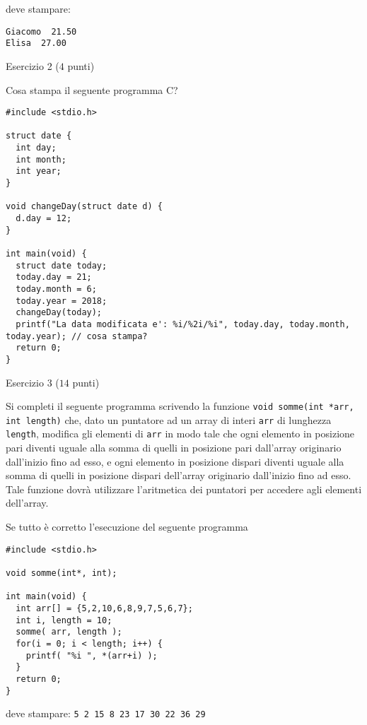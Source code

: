 \documentclass[12pt]{article}
\begin{document}
\noindent
deve stampare:

{\small
\begin{verbatim}
Giacomo  21.50
Elisa  27.00
\end{verbatim}
}


\vspace*{1ex}


\begin{center}
{\Large Esercizio 2} ($4$ punti)
\end{center}

\noindent Cosa stampa il seguente programma C?

\begin{lstlisting}
#include <stdio.h>
 
struct date {
  int day;
  int month;
  int year;
}

void changeDay(struct date d) {
  d.day = 12;  
}
 
int main(void) {
  struct date today;
  today.day = 21;
  today.month = 6;
  today.year = 2018;  
  changeDay(today);
  printf("La data modificata e': %i/%2i/%i", today.day, today.month, today.year); // cosa stampa?
  return 0;
}
\end{lstlisting}

\vspace*{1ex}


\begin{center}{\Large Esercizio 3} ($14$ punti)\end{center}


Si completi il seguente programma scrivendo la  funzione 
\texttt{void somme(int *arr, int length)} che, dato un puntatore ad un array di interi \texttt{arr} di lunghezza \texttt{length}, modifica gli elementi di \texttt{arr} in modo tale che ogni elemento in posizione pari diventi uguale alla somma di quelli in posizione pari dall'array originario dall'inizio fino ad esso, e ogni elemento in posizione dispari diventi uguale alla somma di quelli in posizione dispari dell'array originario dall'inizio fino ad esso. Tale funzione dovr\`a utilizzare l'aritmetica dei puntatori per accedere agli elementi dell'array.


Se tutto \`e corretto l'esecuzione del seguente programma

\begin{lstlisting}
#include <stdio.h>

void somme(int*, int);

int main(void) {
  int arr[] = {5,2,10,6,8,9,7,5,6,7};
  int i, length = 10;
  somme( arr, length );  
  for(i = 0; i < length; i++) {
    printf( "%i ", *(arr+i) );
  }
  return 0;
}
\end{lstlisting}

\noindent deve stampare:
%
\texttt{5 2 15 8 23 17 30 22 36 29}
\end{document}
